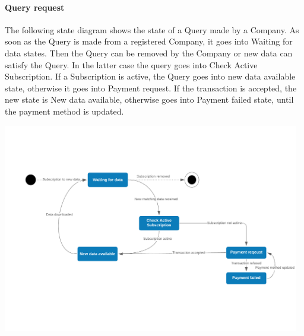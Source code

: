 \paragraph{Query request}
The following state diagram shows the state of a Query made by a Company. As soon as the Query is made from a registered Company, it goes into Waiting for data states. Then the Query can be removed by the Company or new data can satisfy the Query. In the latter case the query goes into Check Active Subscription. If a Subscription is active, the Query goes into new data available state, otherwise it goes into Payment request. If the transaction is accepted, the new state is New data available, otherwise goes into Payment failed state, until the payment method is updated.
\begin{center}
    \includegraphics[width=13cm]{assets/Data_request.pdf}
\end{center}
